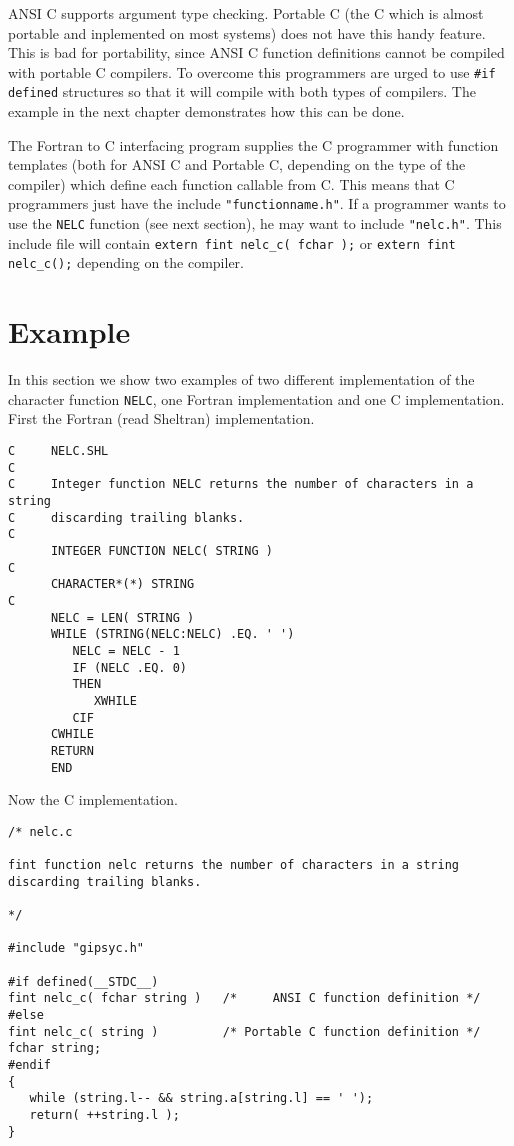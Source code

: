 ANSI C supports argument type checking.  Portable C (the C which is
almost portable and inplemented on most systems) does not have this
handy feature.  This is bad for portability, since ANSI C function
definitions cannot be compiled with portable C compilers.  To overcome
this programmers are urged to use {\tt \#if defined} structures so that
it will compile with both types of compilers.  The example in the next
chapter demonstrates how this can be done. 

The Fortran to C interfacing program supplies the C programmer with
function templates (both for ANSI C and Portable C, depending on the
type of the compiler) which define each function callable from C.  This
means that C programmers just have the include {\tt "functionname.h"}. 
If a programmer wants to use the {\tt NELC} function (see next section),
he may want to include {\tt "nelc.h"}.  This include file will contain
{\tt extern fint nelc\_c( fchar );} or {\tt extern fint nelc\_c();}
depending on the compiler.

\section{Example}

In this section we show two examples of two different implementation of
the character function {\tt NELC}, one Fortran implementation and one C
implementation. First the Fortran (read Sheltran) implementation.

\begin{verbatim}
C     NELC.SHL
C
C     Integer function NELC returns the number of characters in a string
C     discarding trailing blanks.
C
      INTEGER FUNCTION NELC( STRING )
C
      CHARACTER*(*) STRING
C
      NELC = LEN( STRING )
      WHILE (STRING(NELC:NELC) .EQ. ' ')
         NELC = NELC - 1
         IF (NELC .EQ. 0)
         THEN
            XWHILE
         CIF
      CWHILE
      RETURN
      END
\end{verbatim}

\noindent Now the C implementation.

\begin{verbatim}
/* nelc.c

fint function nelc returns the number of characters in a string
discarding trailing blanks.

*/

#include "gipsyc.h"

#if defined(__STDC__)
fint nelc_c( fchar string )   /*     ANSI C function definition */
#else
fint nelc_c( string )         /* Portable C function definition */
fchar string;
#endif
{
   while (string.l-- && string.a[string.l] == ' ');
   return( ++string.l );
}
\end{verbatim}

